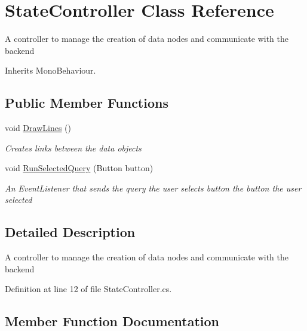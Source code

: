 \hypertarget{class_state_controller}{}\section{State\+Controller Class Reference}
\label{class_state_controller}


A controller to manage the creation of data nodes and communicate with the backend  




Inherits Mono\+Behaviour.

\subsection*{Public Member Functions}
\begin{DoxyCompactItemize}
\item 
void \hyperlink{class_state_controller_ac4dd64476d977178309569f7ae2b7c7d}{Draw\+Lines} ()
\begin{DoxyCompactList}\small\item\em Creates links between the data objects \end{DoxyCompactList}\item 
void \hyperlink{class_state_controller_ad262fec81076b9c60735050264d337fd}{Run\+Selected\+Query} (Button button)
\begin{DoxyCompactList}\small\item\em An Event\+Listener that sends the query the user selects  button the button the user selected \end{DoxyCompactList}\end{DoxyCompactItemize}


\subsection{Detailed Description}
A controller to manage the creation of data nodes and communicate with the backend 



Definition at line 12 of file State\+Controller.\+cs.



\subsection{Member Function Documentation}
\mbox{\label{class_state_controller_ac4dd64476d977178309569f7ae2b7c7d}} 
